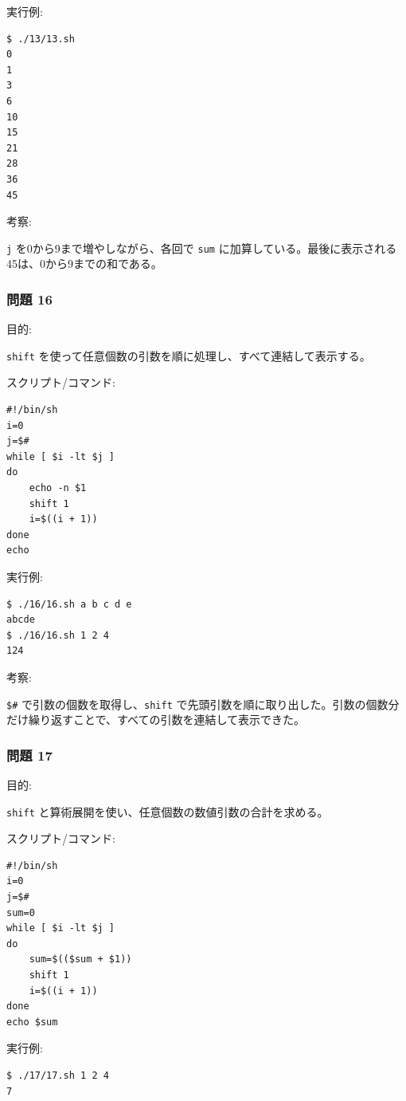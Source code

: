 \documentclass[12pt,a4paper]{jsarticle}
\begin{document}
実行例:\par
\begin{lstlisting}
$ ./13/13.sh
0
1
3
6
10
15
21
28
36
45
\end{lstlisting}

考察:\par
\texttt{j} を0から9まで増やしながら、各回で \texttt{sum} に加算している。最後に表示される45は、0から9までの和である。

\vspace{0.7cm}

\subsubsection*{問題 16}
目的:\par
\texttt{shift} を使って任意個数の引数を順に処理し、すべて連結して表示する。

スクリプト/コマンド:\par
\begin{lstlisting}
#!/bin/sh
i=0
j=$#
while [ $i -lt $j ]
do
    echo -n $1
    shift 1
    i=$((i + 1))
done
echo
\end{lstlisting}

実行例:\par
\begin{lstlisting}
$ ./16/16.sh a b c d e
abcde
$ ./16/16.sh 1 2 4
124
\end{lstlisting}

考察:\par
\texttt{\$\#} で引数の個数を取得し、\texttt{shift} で先頭引数を順に取り出した。引数の個数分だけ繰り返すことで、すべての引数を連結して表示できた。

\vspace{0.7cm}

\subsubsection*{問題 17}
目的:\par
\texttt{shift} と算術展開を使い、任意個数の数値引数の合計を求める。

スクリプト/コマンド:\par
\begin{lstlisting}
#!/bin/sh
i=0
j=$#
sum=0
while [ $i -lt $j ]
do
    sum=$(($sum + $1))
    shift 1
    i=$((i + 1))
done
echo $sum
\end{lstlisting}

実行例:\par
\begin{lstlisting}
$ ./17/17.sh 1 2 4
7
\end{lstlisting}
\end{document}
